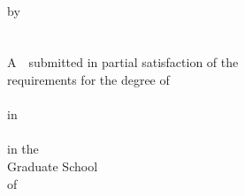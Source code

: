 {\begin{titlepage}
\begin{spacing}{2}
\hangindent=2.7cm   %
{\noindent
\makebox[2.59cm][s]{} {\hei\erhao\@dtitle}}%
\end{spacing}
\vspace{4\baselineskip}

\setlength{\@title@width}{6.5cm}
  {
  \begin{spacing}{2}
  \xiaosi
  \noindent
   \end{spacing}
    }

\clearpage
\thispagestyle{empty} %

\begin{center}
\qquad\\
 \begin{spacing}{2.5}
 \xiaosan \@etitle

 \end{spacing}



 \begin{spacing}{2}
 \xiaosi
 by\\
 \@ename \\
 \@cbe\\
 A~\@cdegree~submitted in partial satisfaction of the\\
 requirements for the degree of\\
 \@cclass\\
 in\\
 \@emajor\\
 in the\\
 Graduate School\\
 of\\
 \@ehnu\\


\end{spacing}
\end{center}
\end{titlepage}}
